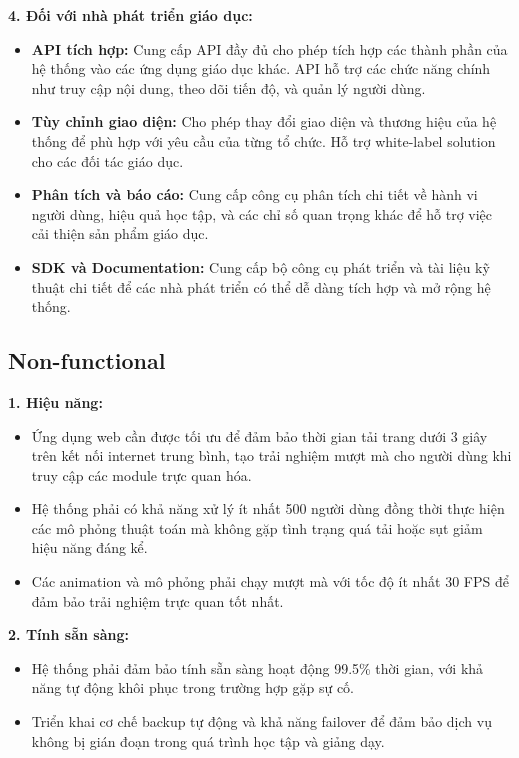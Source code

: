 \textbf{4. Đối với nhà phát triển giáo dục:}

\begin{itemize}
\item \textbf{API tích hợp:} Cung cấp API đầy đủ cho phép tích hợp các thành phần của hệ thống vào các ứng dụng giáo dục khác. API hỗ trợ các chức năng chính như truy cập nội dung, theo dõi tiến độ, và quản lý người dùng.

\item \textbf{Tùy chỉnh giao diện:} Cho phép thay đổi giao diện và thương hiệu của hệ thống để phù hợp với yêu cầu của từng tổ chức. Hỗ trợ white-label solution cho các đối tác giáo dục.

\item \textbf{Phân tích và báo cáo:} Cung cấp công cụ phân tích chi tiết về hành vi người dùng, hiệu quả học tập, và các chỉ số quan trọng khác để hỗ trợ việc cải thiện sản phẩm giáo dục.

\item \textbf{SDK và Documentation:} Cung cấp bộ công cụ phát triển và tài liệu kỹ thuật chi tiết để các nhà phát triển có thể dễ dàng tích hợp và mở rộng hệ thống.
\end{itemize}

\subsection{Non-functional}
\label{subsec:non-functional-req}

\textbf{1. Hiệu năng:}
\begin{itemize}
\item Ứng dụng web cần được tối ưu để đảm bảo thời gian tải trang dưới 3 giây trên kết nối internet trung bình, tạo trải nghiệm mượt mà cho người dùng khi truy cập các module trực quan hóa.
\item Hệ thống phải có khả năng xử lý ít nhất 500 người dùng đồng thời thực hiện các mô phỏng thuật toán mà không gặp tình trạng quá tải hoặc sụt giảm hiệu năng đáng kể.
\item Các animation và mô phỏng phải chạy mượt mà với tốc độ ít nhất 30 FPS để đảm bảo trải nghiệm trực quan tốt nhất.
\end{itemize}

\textbf{2. Tính sẵn sàng:}
\begin{itemize}
\item Hệ thống phải đảm bảo tính sẵn sàng hoạt động 99.5\% thời gian, với khả năng tự động khôi phục trong trường hợp gặp sự cố.
\item Triển khai cơ chế backup tự động và khả năng failover để đảm bảo dịch vụ không bị gián đoạn trong quá trình học tập và giảng dạy.
\end{itemize}

